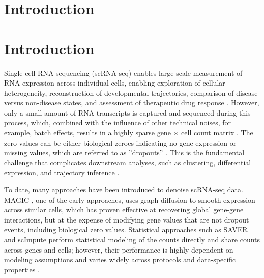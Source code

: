 \documentclass[sigconf,review]{acmart}
\theoremstyle{plain}
\theoremstyle{definition}
\theoremstyle{remark}
\begin{document}


\maketitle

\section{Introduction}
\section{Introduction}
Single-cell RNA sequencing (scRNA-seq) enables large-scale measurement of RNA expression across individual cells, enabling exploration of cellular heterogeneity, reconstruction of developmental trajectories, comparison of disease versus non-disease states, and assessment of therapeutic drug response \citep{Hicks2018MissingData, Luecken2019BestPractices, VanDeSande2023DrugDiscovery}. However, only a small amount of RNA transcripts is captured and sequenced during this process, which, combined with the influence of other technical noises, for example, batch effects, results in a highly sparse gene $\times$ cell count matrix \citep{Brennecke2013TechnicalNoise, Hicks2018MissingData}. The zero values can be either biological zeroes indicating no gene expression or missing values, which are referred to as ''dropouts'' \citep{Li2018scImpute,SarkarStephens2021SeparatingMeasurement,Svensson2020NotZeroInflated,Linderman2022ZeroPreserving}. This is the fundamental challenge that complicates downstream analyses, such as clustering, differential expression, and trajectory inference \citep{Luecken2019BestPractices,Hou2020ImputationBenchmark}.

To date, many approaches have been introduced to denoise scRNA-seq data. MAGIC \citep{vanDijk2018MAGIC}, one of the early approaches, uses graph diffusion to smooth expression across similar cells, which has proven effective at recovering global gene-gene interactions, but at the expense of modifying gene values that are not dropout events, including biological zero values\citep{Li2018scImpute,Linderman2022ZeroPreserving,Hou2020ImputationBenchmark}. Statistical approaches such as SAVER \citep{Huang2018SAVER} and scImpute \citep{Li2018scImpute} perform statistical modeling of the counts directly and share counts across genes and cells; however, their performance is highly dependent on modeling assumptions and varies widely across protocols and data-specific properties \citep{Eraslan2019DCA,Li2022AutoClass,Hou2020ImputationBenchmark}.
\end{document}
